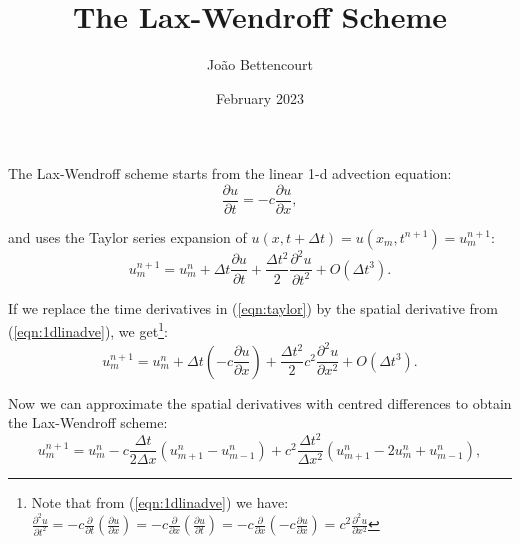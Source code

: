 \documentclass[11pt, oneside]{article}   	%
\title{The Lax-Wendroff Scheme}
\author{Jo\~ao Bettencourt}
\date{February 2023}							%
\begin{document}
\maketitle

The Lax-Wendroff scheme starts from the linear 1-d advection equation:
\begin{equation}\label{eqn:1dlinadve} %
   \frac{\partial u}{\partial t} = -c  \frac{\partial u}{\partial x},
\end{equation}

and uses the Taylor series expansion of $u(x,t+\Delta t)=u(x_m,t^{n+1})=u_{m}^{n+1}$:
\begin{equation}\label{eqn:taylor}
   u_{m}^{n+1} = u_{m}^{n} + \Delta t \frac{\partial u}{\partial t} + \frac{\Delta t^2}{2} \frac{\partial^2 u}{\partial t^2}+O(\Delta t^3).
\end{equation} 

If we replace the time derivatives in (\ref{eqn:taylor}) by the spatial derivative from (\ref{eqn:1dlinadve}), 
we get\footnote{Note that from (\ref{eqn:1dlinadve}) we have:
\(\frac{\partial^2 u}{\partial t^2} = -c  \frac{\partial}{\partial t} \left(\frac{\partial u}{\partial x}\right)=
-c  \frac{\partial }{\partial x} \left(\frac{\partial u}{\partial t}\right)=-c  \frac{\partial }{\partial x} \left(-c\frac{\partial u}{\partial x}\right)=
c^2  \frac{\partial^2 u}{\partial x^2}\)}: 
\begin{equation}\label{eqn:taylor2}
   u_{m}^{n+1} = u_{m}^{n} + \Delta t (-c\frac{\partial u}{\partial x}) + \frac{\Delta t^2}{2} c^{2}\frac{\partial^2 u}{\partial x^2}+O(\Delta t^3).
\end{equation} 

Now we can approximate the spatial derivatives with centred differences to obtain the Lax-Wendroff scheme:
\begin{equation}\label{eqn:lax}
   u_{m}^{n+1} = u_{m}^{n} - c\frac{\Delta t}{2\Delta x}(u_{m+1}^{n}-u_{m-1}^{n}) + c^2\frac{\Delta t^2}{\Delta x^2}(u_{m+1}^{n}-2u_{m}^{n}+u_{m-1}^{n}),
\end{equation} 
\end{document}
